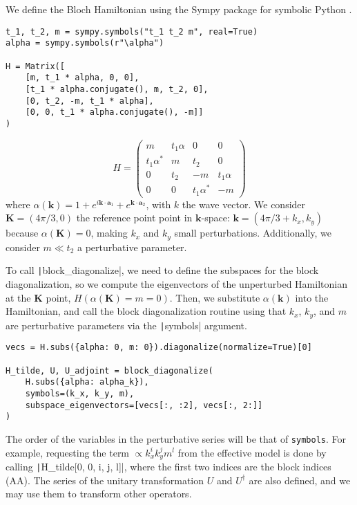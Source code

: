 We define the Bloch Hamiltonian using the Sympy package for symbolic Python
\cite{Meurer_2017}.
%
\begin{verbatim}
t_1, t_2, m = sympy.symbols("t_1 t_2 m", real=True)
alpha = sympy.symbols(r"\alpha")

H = Matrix([
    [m, t_1 * alpha, 0, 0],
    [t_1 * alpha.conjugate(), m, t_2, 0],
    [0, t_2, -m, t_1 * alpha],
    [0, 0, t_1 * alpha.conjugate(), -m]]
)
\end{verbatim}

$$
H =
\begin{pmatrix}
m & t_1 \alpha & 0 & 0\\
t_1 \alpha^{*} & m & t_2 & 0\\
0 & t_2 & -m & t_1 \alpha\\
0 & 0 & t_1 \alpha^{*} & -m
\end{pmatrix}
$$
%
where $\alpha(\mathbf{k}) = 1 + e^{i \mathbf{k} \cdot \mathbf{a}_1} + e^{\mathbf{k} \cdot
\mathbf{a}_2}$, with $k$ the wave vector.
We consider $\mathbf{K}=(4\pi/3, 0)$ the reference point point in $\mathbf{k}$-space:
$\mathbf{k} = (4\pi/3 + k_x, k_y)$ because $\alpha(\mathbf{K}) = 0$, making
$k_x$ and $k_y$ small perturbations.
Additionally, we consider $m \ll t_2$ a perturbative parameter.

To call \texttt|block_diagonalize|, we need to define the subspaces
for the block diagonalization, so we compute the eigenvectors of the
unperturbed Hamiltonian at the $\mathbf{K}$ point, $H(\alpha(\mathbf{K}) = m =
0)$.
Then, we substitute $\alpha(\mathbf{k})$ into the Hamiltonian, and call the
block diagonalization routine using that $k_x$, $k_y$, and $m$ are perturbative
parameters via the \texttt|symbols| argument.
%
\begin{verbatim}
vecs = H.subs({alpha: 0, m: 0}).diagonalize(normalize=True)[0]

H_tilde, U, U_adjoint = block_diagonalize(
    H.subs({alpha: alpha_k}),
    symbols=(k_x, k_y, m),
    subspace_eigenvectors=[vecs[:, :2], vecs[:, 2:]]
)
\end{verbatim}
%
The order of the variables in the perturbative series will be that of
\texttt{symbols}.
For example, requesting the term $\propto k_x^{i} k_y^{j} m^{l}$ from the
effective model is done by calling \texttt|H_tilde[0, 0, i, j, l]|,
where the first two indices are the block indices (AA).
The series of the unitary transformation $U$ and $U^\dagger$ are also defined,
and we may use them to transform other operators.


